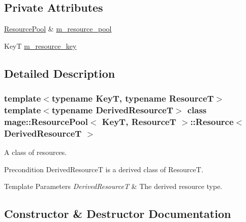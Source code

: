 \subsection*{Private Attributes}
\begin{DoxyCompactItemize}
\item 
\mbox{\hyperlink{classmage_1_1_resource_pool}{Resource\+Pool}} \& \mbox{\hyperlink{classmage_1_1_resource_pool_1_1_resource_a9e5b68fd638ed6bd3b271afff834aced}{m\+\_\+resource\+\_\+pool}}
\item 
KeyT \mbox{\hyperlink{classmage_1_1_resource_pool_1_1_resource_a7200f97a65becde72367c9d0e3641621}{m\+\_\+resource\+\_\+key}}
\end{DoxyCompactItemize}


\subsection{Detailed Description}
\subsubsection*{template$<$typename KeyT, typename ResourceT$>$\newline
template$<$typename Derived\+ResourceT$>$\newline
class mage\+::\+Resource\+Pool$<$ Key\+T, Resource\+T $>$\+::\+Resource$<$ Derived\+Resource\+T $>$}

A class of resources.

\begin{DoxyPrecond}{Precondition}
{\ttfamily Derived\+ResourceT} is a derived class of {\ttfamily ResourceT}. 
\end{DoxyPrecond}

\begin{DoxyTemplParams}{Template Parameters}
{\em Derived\+ResourceT} & The derived resource type. \\
\hline
\end{DoxyTemplParams}


\subsection{Constructor \& Destructor Documentation}
\mbox{\label{classmage_1_1_resource_pool_1_1_resource_a552bb997277371d36aa1bf2248d83f4f}} 
